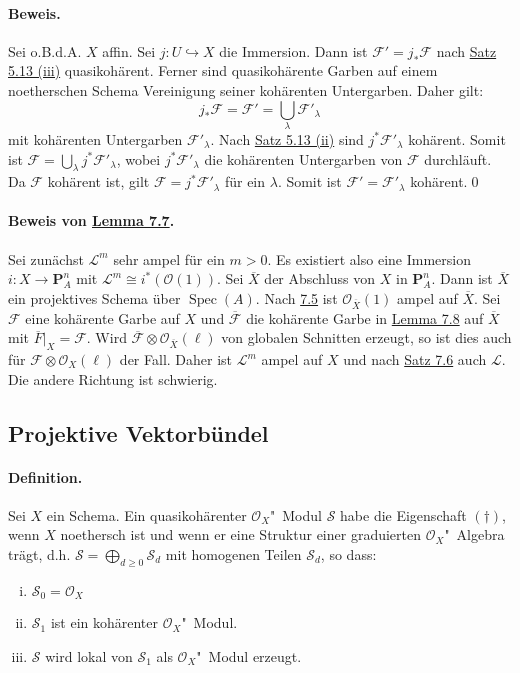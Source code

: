 \paragraph{Beweis.} Sei o.B.d.A. $X$ affin. Sei $j:U\hookrightarrow X$ die Immersion. Dann ist $\mathcal{F}'=j_\ast\mathcal{F}$ nach \hyperref[5.13]{Satz 5.13 (iii)} quasikohärent. Ferner sind quasikohärente Garben auf einem noetherschen Schema Vereinigung seiner kohärenten Untergarben. Daher gilt:
\[j_\ast\mathcal{F} =\mathcal{F}' = \bigcup_\lambda\mathcal{F}'_\lambda \]
mit kohärenten Untergarben $\mathcal{F}'_\lambda$. Nach \hyperref[5.13]{Satz 5.13 (ii)} sind $j^\ast\mathcal{F}'_\lambda$ kohärent. Somit ist $\mathcal{F}=\bigcup_\lambda j^\ast\mathcal{F}'_\lambda$, wobei $j^\ast\mathcal{F}'_\lambda$ die kohärenten Untergarben von $\mathcal{F}$ durchläuft. Da $\mathcal{F}$ kohärent ist, gilt $\mathcal{F}=j^\ast\mathcal{F}'_\lambda$ für ein $\lambda$. Somit ist $\mathcal{F}'=\mathcal{F}'_\lambda$ kohärent.\qed

\paragraph{Beweis von \hyperref[7.7]{Lemma 7.7}.} Sei zunächst $\mathcal{L}^m$ sehr ampel für ein $m>0$. Es existiert also eine Immersion $i:X\to\mathbf{P}_A^n$ mit $\mathcal{L}^m\cong i^\ast(\mathcal{O}(1))$. Sei $\overline{X}$ der Abschluss von $X$ in $\mathbf{P}_A^n$. Dann ist $\overline{X}$ ein projektives Schema über $\operatorname{Spec}(A)$. Nach \hyperref[7.5]{7.5} ist $\mathcal{O}_{\overline{X}}(1)$ ampel auf $\overline{X}$. Sei $\mathcal{F}$ eine kohärente Garbe auf $X$ und $\overline{\mathcal{F}}$ die kohärente Garbe in \hyperref[7.8]{Lemma 7.8} auf $\overline{X}$ mit $\overline{F}|_X=\mathcal{F}$. Wird $\overline{\mathcal{F}}\otimes\mathcal{O}_{\overline{X}}(\ell)$ von globalen Schnitten erzeugt, so ist dies auch für $\mathcal{F}\otimes\mathcal{O}_X(\ell)$ der Fall. Daher ist $\mathcal{L}^m$ ampel auf $X$ und nach \hyperref[7.6]{Satz 7.6} auch $\mathcal{L}$. Die andere Richtung ist schwierig.

\subsection{Projektive Vektorbündel}

\paragraph{Definition.} Sei $X$ ein Schema. Ein quasikohärenter $\mathcal{O}_X$"~Modul $\mathcal{S}$ habe die Eigenschaft $(\dagger)$, wenn $X$ noethersch ist und wenn er eine Struktur einer graduierten $\mathcal{O}_X$"~Algebra trägt, d.h. $\mathcal{S}=\bigoplus_{d\geq 0}\mathcal{S}_d$ mit homogenen Teilen $\mathcal{S}_d$, so dass:
\begin{enumerate}[(i)]
\item $\mathcal{S}_0=\mathcal{O}_X$
\item $\mathcal{S}_1$ ist ein kohärenter $\mathcal{O}_X$"~Modul.
\item $\mathcal{S}$ wird lokal von $\mathcal{S}_1$ als $\mathcal{O}_X$"~Modul erzeugt.
\end{enumerate}

